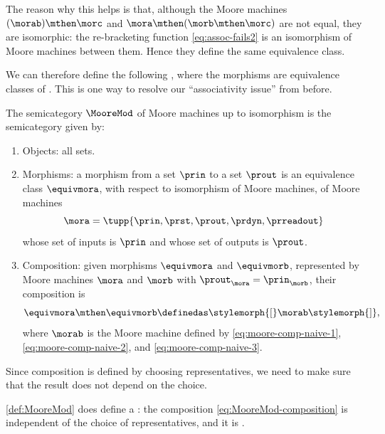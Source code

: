 The reason why this helps is that, although the Moore machines $(\morab) \mthen \morc$ and $\mora \mthen (\morb \mthen \morc)$ are not equal, they are isomorphic: the re-bracketing function \cref{eq:assoc-fails2} is an isomorphism of Moore machines between them.
Hence they define the same equivalence class.

We can therefore define the following , where the morphisms are equivalence classes of .
This is one way to resolve our ``associativity issue'' from before.

\begin{ctdefinition}
    \label{def:MooreMod}
    The semicategory $\MooreMod$ of Moore machines up to isomorphism is the semicategory given by:

    \constit

    \begin{enumerate}
        \item Objects: all sets.
        \item Morphisms: a morphism from a set $\prin$ to a set $\prout$ is an equivalence class $\equivmora$, with respect to isomorphism of Moore machines, of Moore machines
              \begin{equation}
                  \mora = \tupp{\prin,\prst,\prout,\prdyn,\prreadout}
              \end{equation}
              whose set of inputs is $\prin$ and whose set of outputs is $\prout$.
        \item Composition: given morphisms $\equivmora$ and $\equivmorb$, represented by Moore machines $\mora$ and $\morb$ with $\prout_{\mora} = \prin_{\morb}$, their composition is
              \begin{equation}
                  \label{eq:MooreMod-composition}
                  \equivmora \mthen \equivmorb \definedas \stylemorph{[} \morab \stylemorph{]},
              \end{equation}
              where $\morab$ is the Moore machine defined by \cref{eq:moore-comp-naive-1}, \cref{eq:moore-comp-naive-2}, and \cref{eq:moore-comp-naive-3}.
    \end{enumerate}
\end{ctdefinition}

Since composition is defined by choosing representatives, we need to make sure that the result does not depend on the choice.

\begin{lemma}
    \label{lem:MooreMod-semicategory}
    \cref{def:MooreMod} does define a : the composition \cref{eq:MooreMod-composition} is independent of the choice of representatives, and it is .
\end{lemma}

